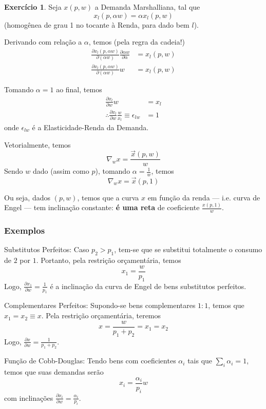 \documentclass[12pt]{article}
\numberwithin{equation}{section}
\theoremstyle{plain}
\theoremstyle{definition}
\newtheorem{exercise}{Exercício}
\theoremstyle{remark}
\begin{document}
\begin{exercise}
    Seja \(x(p,w)\) a Demanda Marshalliana, tal que \[
x_{l}(p, \alpha w) = \alpha x_{l}(p,w)
\] (homogênea de grau 1 no tocante à Renda, para dado bem \(l\)).

Derivando com relação a \(\alpha\), temos (pela regra da cadeia!)
\begin{align}
\frac{ \partial x_{l}(p, \alpha w) }{ \partial (\alpha w) } \frac{ \partial \alpha w }{ \partial \alpha } &= x_{l}(p, w) \\
\frac{ \partial x_{l}(p, \alpha w) }{ \partial (\alpha w) } w &= x_{l}(p, w)
\end{align}

Tomando \(\alpha=1\) ao final,
temos 
\begin{align*}
\frac{ \partial x_{l} }{ \partial w } w &= x_{l} \\
\therefore \frac{ \partial x_{l} }{ \partial w } \frac{w}{x_{l}} \equiv \epsilon_{lw} &= 1
\end{align*} 
onde \(\epsilon_{lw}\) é a Elasticidade-Renda da
Demanda.

Vetorialmente, temos
\[
\nabla_{w} x = \frac{\vec{x}(p, w)}{w}
\] Sendo \(w\) dado (assim como \(p\)), tomando
\(\alpha = \frac{1}{w}\), temos \[
\nabla_{w} x =  \vec{x}(p, 1)
\] 

Ou seja, dados \((p, w)\), temos que a curva \(x\) em função da renda
--- i.e. curva de Engel --- tem inclinação constante:
\textbf{é uma reta} de coeficiente \(\frac{x(p,1)}{w}\).

\subsubsection*{Exemplos}
Substitutos Perfeitos: Caso \(p_{2}>p_{1}\), tem-se que se substitui
  totalmente o consumo de \(2\) por \(1\). Portanto, pela restrição
  orçamentária, temos \[
  x_{1} = \frac{w}{p_{1}}
  \]
Logo, \(\frac{ \partial x_{1} }{ \partial w } = \frac{1}{p_{1}}\) é a
inclinação da curva de Engel de bens substitutos perfeitos.

Complementares Perfeitos: Supondo-se bens complementares \(1:1\), temos
  que \(x_{1}=x_{2}\equiv x\). Pela restrição orçamentária, teremos \[
  x = \frac{w}{p_{1}+p_{2}} = x_{1} = x_{2}
  \] Logo,
  \(\frac{ \partial x }{ \partial w } = \frac{1}{p_{1}+p_{2}}\).


Função de Cobb-Douglas: Tendo bens com coeficientes \(\alpha_{i}\) tais
  que \(\sum_{i} \alpha_{i} = 1\), temos que suas demandas serão \[
  x_{i} = \frac{\alpha_{i}}{p_{i}} w 
  \] com inclinações
  \(\frac{ \partial x_{i} }{ \partial w } = \frac{\alpha_{i}}{p_{i}}\).
\end{exercise}



\printbibliography
\end{document}
